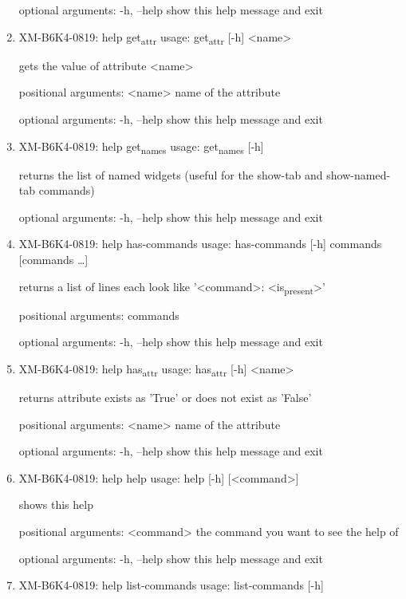 \documentclass[11pt]{article}
\begin{document}
\begin{enumerate}
optional arguments:
  -h, --help  show this help message and exit

\item XM-B6K4-0819: help get\textsubscript{attr}
\label{sec:org505edeb}
usage: get\textsubscript{attr} [-h] <name>

gets the value of attribute <name>

positional arguments:
  <name>      name of the attribute

optional arguments:
  -h, --help  show this help message and exit

\item XM-B6K4-0819: help get\textsubscript{names}
\label{sec:org5875e01}
usage: get\textsubscript{names} [-h]

returns the list of named widgets (useful for the show-tab and show-named-tab
commands)

optional arguments:
  -h, --help  show this help message and exit

\item XM-B6K4-0819: help has-commands
\label{sec:orgd5a9ad4}
usage: has-commands [-h] commands [commands \ldots{}]

returns a list of lines each look like '<command>: <is\textsubscript{present}>'

positional arguments:
  commands

optional arguments:
  -h, --help  show this help message and exit

\item XM-B6K4-0819: help has\textsubscript{attr}
\label{sec:orga5879d0}
usage: has\textsubscript{attr} [-h] <name>

returns attribute exists as 'True' or does not exist as 'False'

positional arguments:
  <name>      name of the attribute

optional arguments:
  -h, --help  show this help message and exit

\item XM-B6K4-0819: help help
\label{sec:org46268fc}
usage: help [-h] [<command>]

shows this help

positional arguments:
  <command>   the command you want to see the help of

optional arguments:
  -h, --help  show this help message and exit

\item XM-B6K4-0819: help list-commands
\label{sec:orga1250e6}
usage: list-commands [-h]


\end{enumerate}
\end{document}
